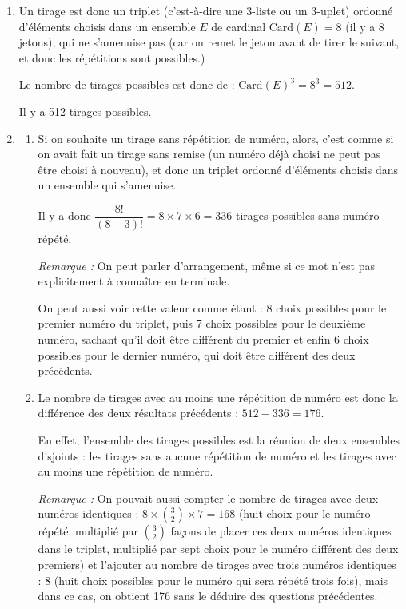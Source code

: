 \medskip
\begin{enumerate}
\item Un tirage est donc un triplet (c'est-à-dire une 3-liste ou un 3-uplet) ordonné d'éléments choisis dans un ensemble $E$ de cardinal $\mathrm{Card}(E) =8$ (il y a 8 jetons), qui ne s'amenuise pas (car on remet le jeton avant de tirer le suivant, et donc les répétitions sont possibles.)

Le nombre de tirages possibles est donc de : \quad $\mathrm{Card}(E)^3 = 8^3 = 512$.

Il y a 512 tirages possibles.

\item \begin{enumerate}
	\item Si on souhaite un tirage sans répétition de numéro, alors, c'est comme si on avait fait un tirage sans remise (un numéro déjà choisi ne peut pas être choisi à nouveau), et donc un triplet ordonné d'éléments choisis dans un ensemble qui s'amenuise.

	Il y a donc $\dfrac{8!}{(8-3)!} = 8 \times 7 \times 6 = 336$ tirages possibles sans numéro répété.

	\emph{Remarque :} On peut parler d'arrangement, même si ce mot n'est pas explicitement à connaître en terminale.

	On peut aussi voir cette valeur comme étant : 8 choix possibles pour le premier numéro du triplet, puis 7 choix possibles pour le deuxième numéro, sachant qu'il doit être différent du premier et enfin 6 choix possibles pour le dernier numéro, qui doit être différent des deux précédents.

	\item Le nombre de tirages avec au moins une répétition de numéro est donc la différence des deux résultats précédents : $512 - 336 = 176$.

	En effet, l'ensemble des tirages possibles est la réunion de deux ensembles disjoints : les tirages sans aucune répétition de numéro et les tirages avec au moins une répétition de numéro.

	\emph{Remarque :} On pouvait aussi compter le nombre de tirages avec deux numéros identiques : $8 \times \displaystyle \binom{3}{2} \times 7= 168$ (huit choix pour le numéro répété, multiplié par $\displaystyle \binom{3}{2}$ façons de placer ces deux numéros identiques dans le triplet, multiplié par sept choix pour le numéro différent des deux premiers) et l'ajouter au nombre de tirages avec trois numéros identiques : $8$ (huit choix possibles pour le numéro qui sera répété trois fois), mais dans ce cas, on obtient 176 sans le déduire des questions précédentes.
\end{enumerate}


\end{enumerate}
